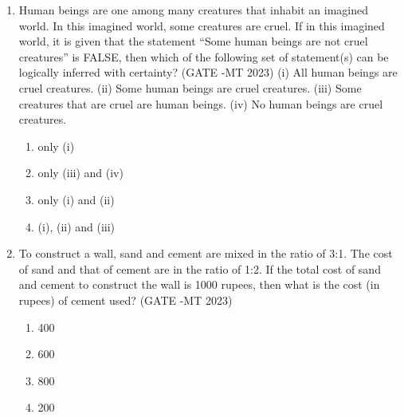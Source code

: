 \documentclass[12pt]{article}
\begin{document}
\begin{enumerate}
\item Human beings are one among many creatures that inhabit an imagined world. In this imagined world, some creatures are cruel. If in this imagined world, it is given that the statement “Some human beings are not cruel creatures” is FALSE, then which of the following set of statement(s) can be logically inferred with certainty? (GATE -MT 2023)
(i) All human beings are cruel creatures.
(ii) Some human beings are cruel creatures.
(iii) Some creatures that are cruel are human beings.
(iv) No human beings are cruel creatures.
\begin{enumerate}[label=(\alph*)]
  \item only (i)
  \item only (iii) and (iv)
  \item only (i) and (ii)
  \item (i), (ii) and (iii)
\end{enumerate}

\item To construct a wall, sand and cement are mixed in the ratio of 3:1. The cost of sand and that of cement are in the ratio of 1:2.  
If the total cost of sand and cement to construct the wall is 1000 rupees, then what is the cost (in rupees) of cement used? (GATE -MT 2023)
\begin{enumerate}[label=(\alph*)]
  \item 400
  \item 600
  \item 800
  \item 200
\end{enumerate}


\end{enumerate}
\end{document}
